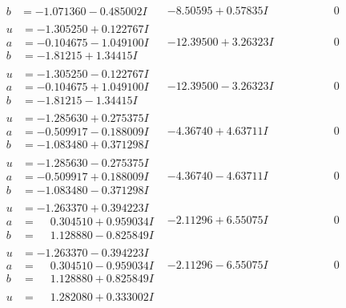 \documentclass[1p]{elsarticle_modified}
\theoremstyle{definition}
\begin{document}
$$\begin{array}{c|c|c}
\begin{aligned}
b &= -1.071360 - 0.485002 I\end{aligned}
 & -8.50595 + 0.57835 I & \phantom{-0.000000 } 0 \\ \hline\begin{aligned}
u &= -1.305250 + 0.122767 I \\
a &= -0.104675 - 1.049100 I \\
b &= -1.81215 + 1.34415 I\end{aligned}
 & -12.39500 + 3.26323 I & \phantom{-0.000000 } 0 \\ \hline\begin{aligned}
u &= -1.305250 - 0.122767 I \\
a &= -0.104675 + 1.049100 I \\
b &= -1.81215 - 1.34415 I\end{aligned}
 & -12.39500 - 3.26323 I & \phantom{-0.000000 } 0 \\ \hline\begin{aligned}
u &= -1.285630 + 0.275375 I \\
a &= -0.509917 - 0.188009 I \\
b &= -1.083480 + 0.371298 I\end{aligned}
 & -4.36740 + 4.63711 I & \phantom{-0.000000 } 0 \\ \hline\begin{aligned}
u &= -1.285630 - 0.275375 I \\
a &= -0.509917 + 0.188009 I \\
b &= -1.083480 - 0.371298 I\end{aligned}
 & -4.36740 - 4.63711 I & \phantom{-0.000000 } 0 \\ \hline\begin{aligned}
u &= -1.263370 + 0.394223 I \\
a &= \phantom{-}0.304510 + 0.959034 I \\
b &= \phantom{-}1.128880 - 0.825849 I\end{aligned}
 & -2.11296 + 6.55075 I & \phantom{-0.000000 } 0 \\ \hline\begin{aligned}
u &= -1.263370 - 0.394223 I \\
a &= \phantom{-}0.304510 - 0.959034 I \\
b &= \phantom{-}1.128880 + 0.825849 I\end{aligned}
 & -2.11296 - 6.55075 I & \phantom{-0.000000 } 0 \\ \hline\begin{aligned}
u &= \phantom{-}1.282080 + 0.333002 I \\

\end{aligned}
\end{array}$$
\end{document}
